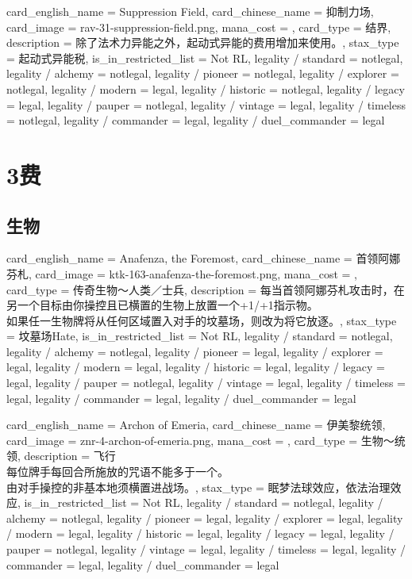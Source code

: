 \documentclass[lang = cn, color = black, 10pt]{AllThatStax}
\begin{document}
\card
{
	card_english_name = {Suppression Field},
	card_chinese_name = {抑制力场},
	card_image = rav-31-suppression-field.png,
	mana_cost = ,
	card_type = 结界,
	description = {除了法术力异能之外，起动式异能的费用增加来使用。},
	stax_type = 起动式异能税,
	is_in_restricted_list = Not RL,
	legality / standard = notlegal,
	legality / alchemy = notlegal,
	legality / pioneer = notlegal,
	legality / explorer = notlegal,
	legality / modern = legal,
	legality / historic = notlegal,
	legality / legacy = legal,
	legality / pauper = notlegal,
	legality / vintage = legal,
	legality / timeless = notlegal,
	legality / commander = legal,
	legality / duel_commander = legal
}

\chapter{3费}

\section{生物}

\card
{
	card_english_name = {Anafenza, the Foremost},
	card_chinese_name = {首领阿娜芬札},
	card_image = ktk-163-anafenza-the-foremost.png,
	mana_cost = ,
	card_type = 传奇生物～人类／士兵,
	description = {每当首领阿娜芬札攻击时，在另一个目标由你操控且已横置的生物上放置一个+1/+1指示物。\\
如果任一生物牌将从任何区域置入对手的坟墓场，则改为将它放逐。},
	stax_type = 坟墓场Hate,
	is_in_restricted_list = Not RL,
	legality / standard = notlegal,
	legality / alchemy = notlegal,
	legality / pioneer = legal,
	legality / explorer = legal,
	legality / modern = legal,
	legality / historic = legal,
	legality / legacy = legal,
	legality / pauper = notlegal,
	legality / vintage = legal,
	legality / timeless = legal,
	legality / commander = legal,
	legality / duel_commander = legal
}

\card
{
	card_english_name = {Archon of Emeria},
	card_chinese_name = {伊美黎统领},
	card_image = znr-4-archon-of-emeria.png,
	mana_cost = ,
	card_type = 生物～统领,
	description = {飞行\\
每位牌手每回合所施放的咒语不能多于一个。\\
由对手操控的非基本地须横置进战场。},
	stax_type = 眠梦法球效应，依法治理效应,
	is_in_restricted_list = Not RL,
	legality / standard = notlegal,
	legality / alchemy = notlegal,
	legality / pioneer = legal,
	legality / explorer = legal,
	legality / modern = legal,
	legality / historic = legal,
	legality / legacy = legal,
	legality / pauper = notlegal,
	legality / vintage = legal,
	legality / timeless = legal,
	legality / commander = legal,
	legality / duel_commander = legal
}
\end{document}
